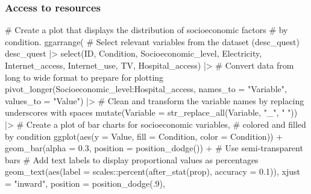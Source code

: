 \documentclass[
  bookmarksnumbered]{article}
\newenvironment{Shaded}{\begin{snugshade}}{\end{snugshade}}
\newcommand{\AttributeTok}[1]{\textcolor[rgb]{0.80,0.80,0.80}{#1}}
\newcommand{\CommentTok}[1]{\textcolor[rgb]{0.50,0.62,0.50}{#1}}
\newcommand{\DecValTok}[1]{\textcolor[rgb]{0.86,0.86,0.80}{#1}}
\newcommand{\FloatTok}[1]{\textcolor[rgb]{0.75,0.75,0.82}{#1}}
\newcommand{\FunctionTok}[1]{\textcolor[rgb]{0.94,0.94,0.56}{#1}}
\newcommand{\NormalTok}[1]{\textcolor[rgb]{0.80,0.80,0.80}{#1}}
\newcommand{\SpecialCharTok}[1]{\textcolor[rgb]{0.86,0.64,0.64}{#1}}
\newcommand{\StringTok}[1]{\textcolor[rgb]{0.80,0.58,0.58}{#1}}
\begin{document}
\subsubsection{Access to resources}\label{access-to-resources}

\begin{Shaded}
\begin{Highlighting}[]
\CommentTok{\# Create a plot that displays the distribution of socioeconomic factors}
\CommentTok{\# by condition.}
\FunctionTok{ggarrange}\NormalTok{(}
  \CommentTok{\# Select relevant variables from the dataset (desc\_quest)}
\NormalTok{  desc\_quest }\SpecialCharTok{|\textgreater{}} 
    \FunctionTok{select}\NormalTok{(ID, Condition,}
\NormalTok{           Socioeconomic\_level, Electricity, Internet\_access, Internet\_use,}
\NormalTok{           TV, Hospital\_access) }\SpecialCharTok{|\textgreater{}}
    \CommentTok{\# Convert data from long to wide format to prepare for plotting}
    \FunctionTok{pivot\_longer}\NormalTok{(Socioeconomic\_level}\SpecialCharTok{:}\NormalTok{Hospital\_access,}
                 \AttributeTok{names\_to =} \StringTok{"Variable"}\NormalTok{,}
                 \AttributeTok{values\_to =} \StringTok{"Value"}\NormalTok{) }\SpecialCharTok{|\textgreater{}} 
    \CommentTok{\# Clean and transform the variable names by replacing underscores with spaces}
    \FunctionTok{mutate}\NormalTok{(}\AttributeTok{Variable =} \FunctionTok{str\_replace\_all}\NormalTok{(Variable, }\StringTok{"\_"}\NormalTok{, }\StringTok{" "}\NormalTok{)) }\SpecialCharTok{|\textgreater{}}
    \CommentTok{\# Create a plot of bar charts for socioeconomic variables, }
    \CommentTok{\# colored and filled by condition}
    \FunctionTok{ggplot}\NormalTok{(}\FunctionTok{aes}\NormalTok{(}\AttributeTok{y =}\NormalTok{ Value, }\AttributeTok{fill =}\NormalTok{ Condition, }\AttributeTok{color =}\NormalTok{ Condition)) }\SpecialCharTok{+}
    \FunctionTok{geom\_bar}\NormalTok{(}\AttributeTok{alpha =} \FloatTok{0.3}\NormalTok{, }\AttributeTok{position =} \FunctionTok{position\_dodge}\NormalTok{()) }\SpecialCharTok{+}  \CommentTok{\# Use semi{-}transparent bars}
    \CommentTok{\# Add text labels to display proportional values as percentages}
    \FunctionTok{geom\_text}\NormalTok{(}\FunctionTok{aes}\NormalTok{(}\AttributeTok{label =}\NormalTok{ scales}\SpecialCharTok{::}\FunctionTok{percent}\NormalTok{(}\FunctionTok{after\_stat}\NormalTok{(prop), }\AttributeTok{accuracy =} \FloatTok{0.1}\NormalTok{)),}
              \AttributeTok{xjust =} \StringTok{"inward"}\NormalTok{,}
              \AttributeTok{position =} \FunctionTok{position\_dodge}\NormalTok{(.}\DecValTok{9}\NormalTok{),}

\end{Highlighting}
\end{Shaded}
\end{document}
